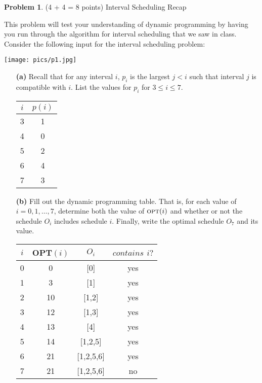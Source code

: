 \documentclass[11pt]{article}
\newcommand{\opt}{\mbox{\textsc{opt}}}
\theoremstyle{definition}
\theoremstyle{theorem}
\newtheorem{prob}{Problem}
\begin{document}
\begin{prob}(4 + 4 = 8 points) Interval Scheduling Recap\end{prob}
This problem will test your understanding of dynamic programming by
having you run through the algorithm for interval scheduling that we
saw in class.  Consider the following input for the interval
scheduling problem:
\begin{center}
	\texttt{[image: pics/p1.jpg]}
\end{center}
\begin{itemize}
\item[{\bf (a)}] Recall that for any interval $i$, $p_i$ is the largest $j < i$ such that interval $j$ is compatible with $i$.  List the values for $p_i$ for $3 \le i \le 7$.

\begin{tabular}{ |c|c| } 
 \hline
 $i$ & $p(i)$ \\ 
 \hline
 3 & 1 \\ 
 4 & 0 \\ 
 5 & 2 \\ 
 6 & 4 \\ 
 7 & 3 \\ 
 \hline
\end{tabular}

\begin{algorithm}[H]
\end{algorithm}

  \item[{\bf (b)}] Fill out the dynamic programming table.  That is,
    for each value of $i = 0, 1, \ldots, 7$, determine both the value
    of $\opt(i)$ and whether or not the schedule $O_i$ includes
    schedule $i$.  Finally, write the optimal schedule $O_7$ and its
    value.
    
\begin{tabular}{ |c|c|c|c| } 
 \hline
 $i$ & OPT$(i)$ & $O_i$ & $contains$ $i?$ \\ 
 \hline
 0 & 0 & [0] & yes \\ 
 1 & 3 & [1] & yes \\ 
 2 & 10 & [1,2] & yes \\
 3 & 12 & [1,3] & yes \\
 4 & 13 & [4] & yes \\
 5 & 14 & [1,2,5] & yes \\
 6 & 21 & [1,2,5,6] & yes \\
 7 & 21 & [1,2,5,6] & no \\
 \hline
\end{tabular}

\end{itemize}
\end{document}

